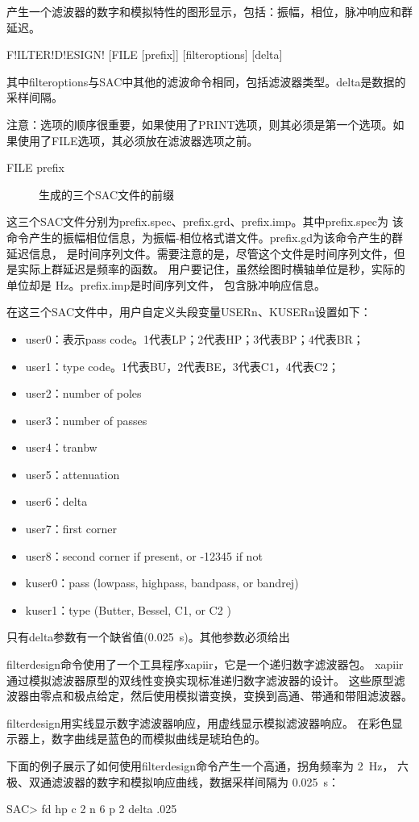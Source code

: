 \label{cmd:filterdesign}

产生一个滤波器的数字和模拟特性的图形显示，包括：振幅，相位，脉冲响应和群延迟。

\begin{SACSTX}
F!ILTER!D!ESIGN! [FILE [prefix]] [filteroptions] [delta]
\end{SACSTX}
其中filteroptions与SAC中其他的滤波命令相同，包括滤波器类型。delta是数据的采样间隔。

注意：选项的顺序很重要，如果使用了PRINT选项，则其必须是第一个选项。如果使用了FILE选项，其必须放在滤波器选项之前。

\begin{description}
\item [FILE prefix] 生成的三个SAC文件的前缀
\end{description}

这三个SAC文件分别为prefix.spec、prefix.grd、prefix.imp。其中prefix.spec为
该命令产生的振幅相位信息，为振幅-相位格式谱文件。prefix.gd为该命令产生的群延迟信息，
是时间序列文件。需要注意的是，尽管这个文件是时间序列文件，但是实际上群延迟是频率的函数。
用户要记住，虽然绘图时横轴单位是秒，实际的单位却是 \si{\Hz}。prefix.imp是时间序列文件，
包含脉冲响应信息。

在这三个SAC文件中，用户自定义头段变量USERn、KUSERn设置如下：
\begin{itemize}
\item user0：表示pass code。1代表LP；2代表HP；3代表BP；4代表BR；
\item user1：type code。1代表BU，2代表BE，3代表C1，4代表C2；
\item user2：number of poles
\item user3：number of passes
\item user4：tranbw
\item user5：attenuation
\item user6：delta
\item user7：first corner
\item user8：second corner if present, or -12345 if not
\item kuser0：pass (lowpass, highpass, bandpass, or bandrej)
\item kuser1：type (Butter, Bessel, C1, or C2 )
\end{itemize}

只有delta参数有一个缺省值(\SI{0.025}{\s})。其他参数必须给出

filterdesign命令使用了一个工具程序xapiir，它是一个递归数字滤波器包。
xapiir通过模拟滤波器原型的双线性变换实现标准递归数字滤波器的设计。
这些原型滤波器由零点和极点给定，然后使用模拟谱变换，变换到高通、带通和带阻滤波器。

filterdesign用实线显示数字滤波器响应，用虚线显示模拟滤波器响应。
在彩色显示器上，数字曲线是蓝色的而模拟曲线是琥珀色的。

下面的例子展示了如何使用filterdesign命令产生一个高通，拐角频率为 \SI{2}{\Hz}，
六极、双通滤波器的数字和模拟响应曲线，数据采样间隔为 \SI{0.025}{\s}：
\begin{SACCode}
SAC> fd hp c 2 n 6 p 2 delta .025
\end{SACCode}

